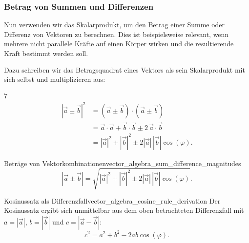 \subsubsection{Betrag von Summen und Differenzen}
\label{subsubsec:vector_algebra_magnitude_sums_differences}

Nun verwenden wir das Skalarprodukt, um den Betrag einer Summe oder Differenz von
Vektoren zu berechnen. Dies ist beispielsweise relevant, wenn mehrere nicht parallele
Kräfte auf einen Körper wirken und die resultierende Kraft bestimmt werden soll.

\begin{center}
\end{center}

Dazu schreiben wir das Betragsquadrat eines Vektors als sein Skalarprodukt mit
sich selbst und multiplizieren aus:
\begin{ClozeArea}[34]{7}
  \[
    \begin{aligned}
      |\vec a\pm\vec b|^2
      &=(\vec a\pm\vec b)\cdot(\vec a\pm\vec b)\\[0.5em]
      &=\vec a\cdot\vec a+\vec b\cdot\vec b
        \pm2\,\vec a\cdot\vec b\\[0.5em]
      &=|\vec a|^2+|\vec b|^2
        \pm2|\vec a|\,|\vec b|\cos(\varphi).
    \end{aligned}
  \]
\end{ClozeArea}

\begin{KeyPointBox}{Beträge von Vektorkombinationen}{vector_algebra_sum_difference_magnitudes}
  \[
    |\vec a\pm\vec b|
    =\sqrt{|\vec a|^2+|\vec b|^2
      \pm2|\vec a|\,|\vec b|\cos(\varphi)}.
  \]
\end{KeyPointBox}

\begin{KeyPointBox}{Kosinussatz als Differenzfall}{vector_algebra_cosine_rule_derivation}
  Der Kosinussatz ergibt sich unmittelbar aus dem oben betrachteten
  Differenzfall mit $a=|\vec a|$, $b=|\vec b|$ und
  $c=|\vec a-\vec b|$:
  \[
    c^2=a^2+b^2-2ab\cos(\varphi).
  \]
\end{KeyPointBox}

